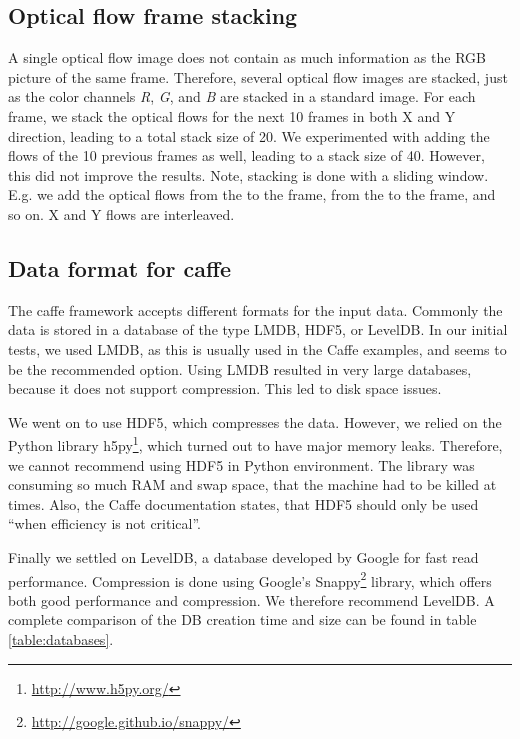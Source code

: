 
\subsection{Optical flow frame stacking}
A single optical flow image does not contain as much information as the RGB picture of the same frame.
Therefore, several optical flow images are stacked, just as the color channels \emph{R}, \emph{G}, and \emph{B} are stacked in a standard image.
For each frame, we stack the optical flows for the next 10 frames in both X and Y direction, leading to a total stack size of 20.
We experimented with adding the flows of the 10 previous frames as well, leading to a stack size of 40.
However, this did not improve the results.
Note, stacking is done with a sliding window. E.g. we add the optical flows from the  to the  frame, from the  to the  frame, and so on. X and Y flows are interleaved.


\subsection{Data format for caffe}
The caffe framework accepts different formats for the input data. Commonly the data is stored in a database of the type LMDB, HDF5, or LevelDB.
In our initial tests, we used LMDB, as this is usually used in the Caffe examples, and seems to be the recommended option.
Using LMDB resulted in very large databases, because it does not support compression.
This led to disk space issues.

We went on to use HDF5, which compresses the data.
However, we relied on the Python library h5py\footnote{\url{http://www.h5py.org/}}, which turned out to have major memory leaks.
Therefore, we cannot recommend using HDF5 in Python environment.
The library was consuming so much RAM and swap space, that the machine had to be killed at times.
Also, the Caffe documentation states, that HDF5 should only be used ``when efficiency is not critical''.

Finally we settled on LevelDB, a database developed by Google for fast read performance.
Compression is done using Google's Snappy\footnote{\url{http://google.github.io/snappy/}} library, which offers both good performance and compression.
We therefore recommend LevelDB. A complete comparison of the DB creation time and size can be found in table \ref{table:databases}.

